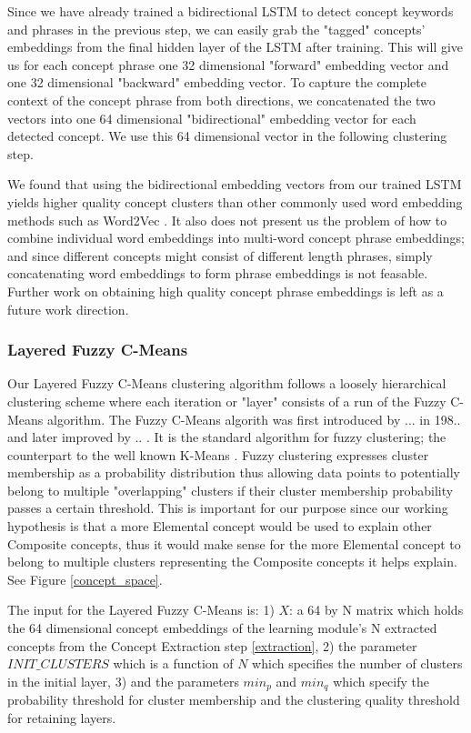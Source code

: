 Since we have already trained a bidirectional LSTM to detect concept keywords and phrases in the previous step, we can easily grab the "tagged" concepts' embeddings from the final hidden layer of the LSTM after training. This will give us for each concept phrase one 32 dimensional "forward" embedding vector and one 32 dimensional "backward" embedding vector. To capture the complete context of the concept phrase from both directions, we concatenated the two vectors into one 64 dimensional "bidirectional" embedding vector for each detected concept. We use this 64 dimensional vector in the following clustering step.

We found that using the bidirectional embedding vectors from our trained LSTM yields higher quality concept clusters than other commonly used word embedding methods such as Word2Vec \cite{}. It also does not present us the problem of how to combine individual word embeddings into multi-word concept phrase embeddings; and since different concepts might consist of different length phrases, simply concatenating word embeddings to form phrase embeddings is not feasable. Further work on obtaining high quality concept phrase embeddings is left as a future work direction.

\subsubsection{Layered Fuzzy C-Means}
Our Layered Fuzzy C-Means clustering algorithm follows a loosely hierarchical clustering scheme where each iteration or "layer" consists of a run of the Fuzzy C-Means algorithm. The Fuzzy C-Means algorith was first introduced by ... in 198.. \cite{} and later improved by .. \cite{}. It is the standard algorithm for fuzzy clustering; the counterpart to the well known K-Means \cite{}. Fuzzy clustering expresses cluster membership as a probability distribution thus allowing data points to potentially belong to multiple "overlapping" clusters if their cluster membership probability passes a certain threshold. This is important for our purpose since our working hypothesis is that a more Elemental concept would be used to explain other Composite concepts, thus it would make sense for the more Elemental concept to belong to multiple clusters representing the Composite concepts it helps explain. See Figure \ref{concept_space}.

The input for the Layered Fuzzy C-Means is: 1) $X$: a 64 by N matrix which holds the 64 dimensional concept embeddings of the learning module's N extracted concepts from the Concept Extraction step \ref{extraction}, 2) the parameter $INIT\_CLUSTERS$ which is a function of $N$ which specifies the number of clusters in the initial layer, 3) and the parameters $min_p$ and $min_q$ which specify the probability threshold for cluster membership and the clustering quality threshold for retaining layers.

